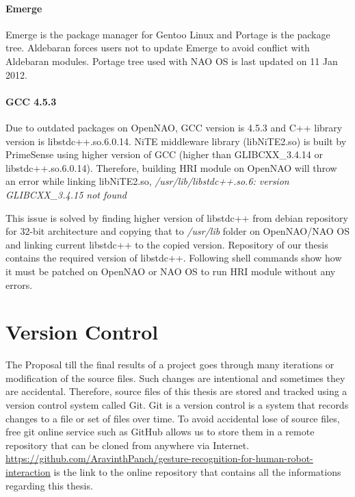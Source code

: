 \paragraph*{Emerge} Emerge is the package manager for Gentoo Linux and Portage is the package tree. Aldebaran forces users not to update Emerge to avoid conflict with Aldebaran modules. Portage tree used with NAO OS is last updated on 11 Jan 2012. 

\paragraph*{GCC 4.5.3} Due to outdated packages on OpenNAO, GCC version is 4.5.3 and C++ library version is libstdc++.so.6.0.14. NiTE middleware library (libNiTE2.so) is built by PrimeSense using higher version of GCC (higher than GLIBCXX\_3.4.14 or libstdc++.so.6.0.14). Therefore, building HRI module on OpenNAO will throw an error while linking libNiTE2.so, \textit{/usr/lib/libstdc++.so.6: version GLIBCXX\_3.4.15 not found}

This issue is solved by finding higher version of libstdc++ from debian repository for 32-bit architecture and copying that to \textit{/usr/lib} folder on OpenNAO/NAO OS and linking current libstdc++ to the copied version. Repository of our thesis contains the required version of libstdc++. Following shell commands show how it must be patched on OpenNAO or NAO OS to run HRI module without any errors.



\section*{Version Control} The Proposal till the final results of a project goes through many iterations or modification of the source files. Such changes are intentional and sometimes they are accidental. Therefore, source files of this thesis are stored and tracked using a version control system called Git. Git is a version control is a system that records changes to a file or set of files over time. To avoid accidental lose of source files, free git online service such as GitHub allows us to store them in a remote repository that can be cloned from anywhere via Internet. \url{https://github.com/AravinthPanch/gesture-recognition-for-human-robot-interaction} is the link to the online repository that contains all the informations regarding this thesis.

